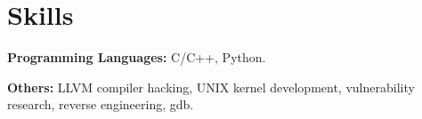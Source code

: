 \documentclass{resume}
\begin{document}

\section{Skills}
\textbf{Programming Languages:} \small C/C++, Python.

\textbf{Others:} \small LLVM compiler hacking, UNIX kernel development, vulnerability research, reverse engineering, gdb.
\end{document}
